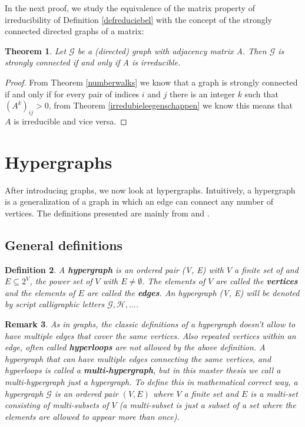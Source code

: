\documentclass[a4paper,11pt]{report}
\newtheorem{theorem}{Theorem}[section]
\newtheorem{definition}[theorem]{Definition}
\newtheorem{remark}[theorem]{Remark}
\newcommand{\graf}{\mathscr{G}}
\newcommand{\hgraf}{\mathcal{G}}
\begin{document}
In the next proof, we study the equivalence of the matrix property of 
irreducibility of  Definition \ref{defreduciebel} with the concept of the 
strongly connected directed graphs of a matrix:
\begin{theorem}
    Let $\graf$ be a (directed) graph with adjacency matrix A. Then $\graf$ is strongly connected if and only if A is irreducible.

\end{theorem}

\begin{proof}
From Theorem \ref{numberwalks} we know that a graph is strongly connected if and only if for every pair of indices $i$ and $j$ 
there is an integer $k$ such that $(A^k)_{ij} > 0$, from Theorem \ref{irredubieleegenschappen} we 
know this means that $A$ is irreducible and vice versa.

\end{proof}
\newpage
\section{Hypergraphs}
After introducing graphs, we now look at hypergraphs. Intuitively, a 
hypergraph is a generalization of a graph in which an edge can connect any 
number of vertices. The definitions presented are mainly from \cite{berge} and 
\cite{hypper}.

\subsection{General definitions}
\begin{definition}\label{defhypergraph}
  A \textbf{hypergraph} is an ordered pair (V, E) with $V$ a finite set of 
and $E \subseteq 2^V$, the power set of $V$ with $E \not= \emptyset$. The elements of $V$ are called
the \textbf{vertices} and the elements of $E$ are called the \textbf{edges}.
An hypergraph (V, E) will be denoted by script calligraphic letters $\mathcal{G}, \mathcal{H},\ldots$.  
  \end{definition}

\begin{remark}

  As in graphs, the classic definitions of a hypergraph doesn't allow to have 
  multiple edges that cover the same vertices. Also repeated vertices within an edge, often called \textbf{hyperloops} are not allowed 
  by the above definition. A hypergraph that can have multiple edges connecting 
  the same vertices, and hyperloops is called a \textbf{multi-hypergraph}, but 
  in this master thesis we call a multi-hypergraph just a hypergraph. To define 
  this in mathematical correct way, a hypergraph $\hgraf$ is an ordered
 pair $(V,E)$ where $V$ a finite set and $E$ is a multi-set consisting of 
multi-subsets of $V$ (a multi-subset is just a subset of a set where the elements are 
allowed to appear more than once).
\end{remark}
\end{document}
